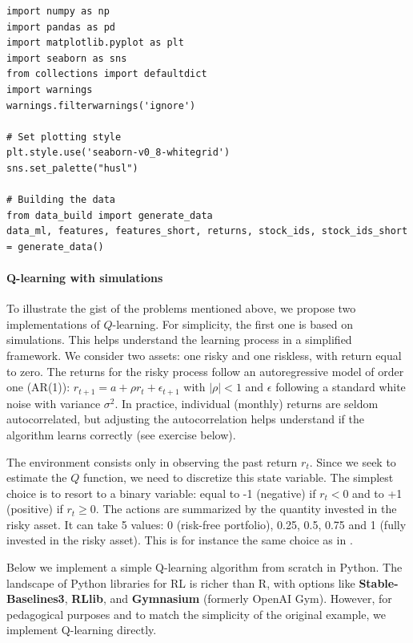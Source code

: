 \begin{verbatim}
import numpy as np
import pandas as pd
import matplotlib.pyplot as plt
import seaborn as sns
from collections import defaultdict
import warnings
warnings.filterwarnings('ignore')

# Set plotting style
plt.style.use('seaborn-v0_8-whitegrid')
sns.set_palette("husl")

# Building the data
from data_build import generate_data
data_ml, features, features_short, returns, stock_ids, stock_ids_short = generate_data()
\end{verbatim}

\paragraph{Q-learning with simulations}

To illustrate the gist of the problems mentioned above, we propose two implementations of $Q$-learning. For simplicity, the first one is based on simulations. This helps understand the learning process in a simplified framework. We consider two assets: one risky and one riskless, with return equal to zero. The returns for the risky process follow an autoregressive model of order one (AR(1)): $r_{t+1}=a+\rho r_t+\epsilon_{t+1}$ with $|\rho|<1$ and $\epsilon$ following a standard white noise with variance $\sigma^2$. In practice, individual (monthly) returns are seldom autocorrelated, but adjusting the autocorrelation helps understand if the algorithm learns correctly (see exercise below).

The environment consists only in observing the past return $r_t$. Since we seek to estimate the $Q$ function, we need to discretize this state variable. The simplest choice is to resort to a binary variable: equal to -1 (negative) if $r_t<0$ and to +1 (positive) if $r_t\ge 0$. The actions are summarized by the quantity invested in the risky asset. It can take 5 values: 0 (risk-free portfolio), 0.25, 0.5, 0.75 and 1 (fully invested in the risky asset). This is for instance the same choice as in \cite{pendharkar2018trading}.

Below we implement a simple Q-learning algorithm from scratch in Python. The landscape of Python libraries for RL is richer than R, with options like \textbf{Stable-Baselines3}, \textbf{RLlib}, and \textbf{Gymnasium} (formerly OpenAI Gym). However, for pedagogical purposes and to match the simplicity of the original example, we implement Q-learning directly.

